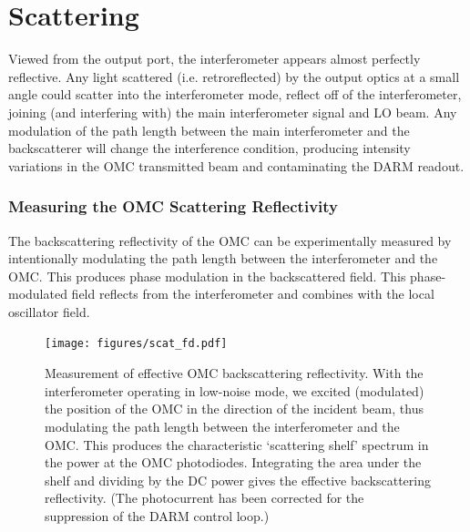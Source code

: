 \section{Scattering}

Viewed from the output port, the interferometer appears almost
perfectly reflective.  Any light scattered (i.e. retroreflected) by
the output optics at a small angle could scatter into the
interferometer mode, reflect off of the interferometer, joining (and
interfering with) the main interferometer signal and LO beam.  Any
modulation of the path length between the main interferometer and the
backscatterer will change the interference condition, producing
intensity variations in the OMC transmitted beam and contaminating the
DARM readout.

\subsubsection{Measuring the OMC Scattering Reflectivity}

The backscattering reflectivity of the OMC can be experimentally
measured by intentionally modulating the path length between the
interferometer and the OMC.  This produces phase modulation in the
backscattered field.  This phase-modulated field reflects from the
interferometer and combines with the local oscillator field.   

\begin{figure}[t]
\texttt{[image: figures/scat\_fd.pdf]}
\caption[Measurement of OMC
  backscatter]{\label{fig:scattering}Measurement of effective OMC
  backscattering reflectivity.  With the interferometer operating in
  low-noise mode, we excited (modulated) the position of the OMC in
  the direction of the incident beam, thus modulating the path length
  between the interferometer and the OMC.  This produces the
  characteristic `scattering shelf' spectrum in the power at the OMC
  photodiodes.  Integrating the area under the shelf and dividing by
  the DC power gives the effective backscattering reflectivity. (The
  photocurrent has been corrected for the suppression of the DARM
  control loop.)}
\end{figure}

